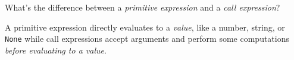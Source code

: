\begin{blocksection}
\question What's the difference between a \emph{primitive expression} and a \emph{call expression}?

\begin{solution}[0.5in]
A primitive expression directly evaluates to a \emph{value}, like a number, string, or \texttt{None} while call expressions accept arguments and perform some computations \emph{before evaluating to a value}.
\end{solution}
\end{blocksection}
